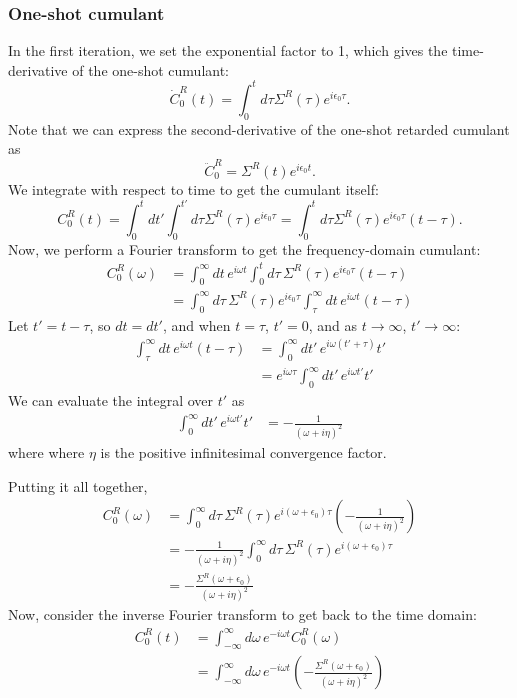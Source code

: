 \subsubsection{One-shot cumulant}
In the first iteration, we set the exponential factor to 1, which gives the time-derivative of the one-shot cumulant:
\begin{equation}
    \dot{C}^{R}_0(t)=\int_0^t d \tau \Sigma^R(\tau) e^{i \epsilon_0 \tau} .
\end{equation}
Note that we can express the second-derivative of the one-shot retarded cumulant as
\begin{equation}
    \ddot{C}^{R}_0= \Sigma^R(t) e^{i \epsilon_0 t} .
\end{equation}
We integrate with respect to time to get the cumulant itself:
\begin{equation}
    C^{R}_0(t)=\int_0^t d t' \int_0^{t'} d \tau \Sigma^R(\tau) e^{i \epsilon_0 \tau} = \int_0^t d \tau \Sigma^R(\tau) e^{i \epsilon_0 \tau} (t-\tau) .
\end{equation}
Now, we perform a Fourier transform to get the frequency-domain cumulant:
\begin{align}
    C^{R}_0(\omega) &= \int_0^\infty dt\, e^{i\omega t} \int_0^t d\tau\, \Sigma^R(\tau) e^{i\epsilon_0 \tau} (t-\tau) \\
    &= \int_0^\infty d\tau\, \Sigma^R(\tau) e^{i\epsilon_0 \tau} \int_\tau^\infty dt\, e^{i\omega t} (t-\tau)
\end{align}
Let $t' = t - \tau$, so $dt = dt'$, and when $t = \tau$, $t' = 0$, and as $t \to \infty$, $t' \to \infty$:
\begin{align}
    \int_\tau^\infty dt\, e^{i\omega t} (t-\tau) &= \int_0^\infty dt'\, e^{i\omega (t'+\tau)} t' \\
    &= e^{i\omega \tau} \int_0^\infty dt'\, e^{i\omega t'} t'
\end{align}
We can evaluate the integral over $t'$ as
\begin{align}
    \int_0^\infty dt'\, e^{i\omega t'} t' & = -\frac{1}{(\omega + i\eta)^2}
\end{align}
where where $\eta$ is the positive infinitesimal convergence factor.

Putting it all together,
\begin{align}
    C^{R}_0(\omega) &= \int_0^\infty d\tau\, \Sigma^R(\tau) e^{i(\omega+\epsilon_0)\tau} \left(-\frac{1}{(\omega + i\eta)^2}\right) \\
    &= -\frac{1}{(\omega + i\eta)^2} \int_0^\infty d\tau\, \Sigma^R(\tau) e^{i(\omega+\epsilon_0)\tau} \\
    &= -\frac{\Sigma^R(\omega+\epsilon_0)}{(\omega + i\eta)^2} 
\end{align}
Now, consider the inverse Fourier transform to get back to the time domain:
\begin{align}
    C^{R}_0(t) &= \int_{-\infty}^{\infty} d\omega\, e^{-i\omega t} C^{R}_0(\omega) \\
    &= \int_{-\infty}^{\infty} d\omega\, e^{-i\omega t} \left(-\frac{\Sigma^R(\omega+\epsilon_0)}{(\omega + i\eta)^2}\right)
\end{align}
